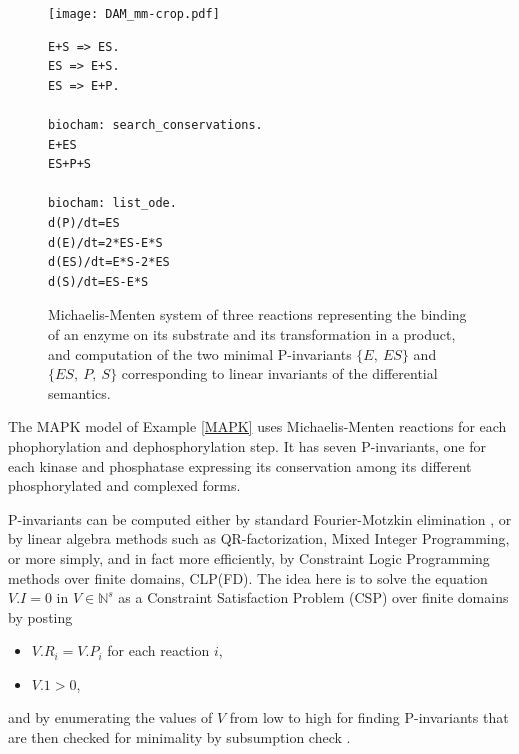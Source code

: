 \documentclass[graybox]{svmult}
\begin{document}
\begin{center}
  \begin{figure}[htb]
  \noindent
  \begin{minipage}{0.5\textwidth}
  \texttt{[image: DAM\_mm-crop.pdf]}
  \end{minipage}
  \begin{minipage}{0.5\textwidth}
\begin{lstlisting}
E+S => ES.
ES => E+S.
ES => E+P.

biocham: search_conservations.
E+ES
ES+P+S

biocham: list_ode.
d(P)/dt=ES
d(E)/dt=2*ES-E*S
d(ES)/dt=E*S-2*ES
d(S)/dt=ES-E*S
\end{lstlisting}
\end{minipage}
  \caption{Michaelis-Menten system of three reactions representing the binding of an enzyme on its substrate and its transformation in a product,
    and computation of the two minimal P-invariants $\{E,\ ES\}$ and $\{ES,\ P,\ S\}$ corresponding to linear invariants of the differential semantics.
  }\label{MMfig}
  \end{figure}
\end{center}  

  The MAPK model of Example \ref{MAPK} uses Michaelis-Menten reactions for each phophorylation and dephosphorylation step.
  It has seven P-invariants,
  one for each kinase and phosphatase expressing its conservation among its different phosphorylated and complexed forms.

  P-invariants can be computed either by standard Fourier-Motzkin elimination \cite{CS90apn},
or by linear algebra methods such as QR-factorization, Mixed Integer Programming,
or more simply, and in fact more efficiently, by Constraint Logic Programming methods over finite domains, CLP(FD).
The idea here is to solve the equation $V.I=0$ in $V\in\mathbb N^s$ as a Constraint Satisfaction Problem (CSP)
over finite domains by posting
\begin{itemize}
  \item $V.R_i=V.P_i$ for each reaction $i$,
  \item $V.1>0$,
\end{itemize}
and by enumerating the values of $V$ from low to high 
for finding P-invariants that are then checked for minimality by subsumption check  \cite{Soliman12amb}.
\end{document}
